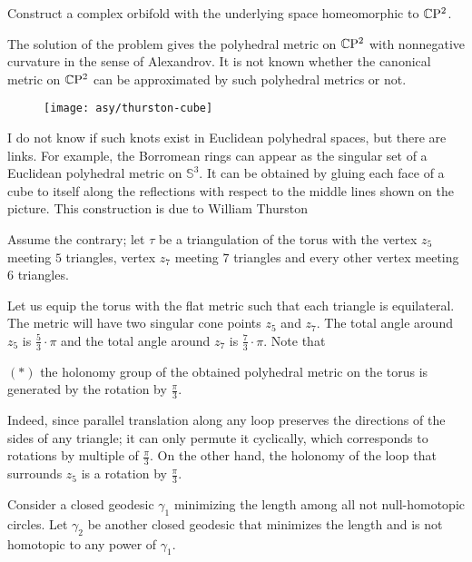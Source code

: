 \begin{pr}
Construct a complex orbifold with the underlying space homeomorphic to $\mathbb{C}\mathrm{P}^2$. 
\end{pr}

The solution of the problem gives the polyhedral metric on $\mathbb{C}\mathrm{P}^2$ with nonnegative curvature in the sense of Alexandrov.
It is not known whether the canonical metric on $\mathbb{C}\mathrm{P}^2$ can be approximated by such polyhedral metrics or not.


\begin{wrapfigure}{r}{23 mm}
\vskip-4mm
\centering
\texttt{[image: asy/thurston-cube]}
\end{wrapfigure}

I do not know if such knots exist in Euclidean polyhedral spaces, but there are links.
For example, the Borromean rings can appear as the singular set of a Euclidean polyhedral metric on $\mathbb S^3$.
It can be obtained by gluing each face of a cube to itself
along the reflections with respect to the middle lines shown on the picture. 
This construction is due to William Thurston \cite{thurston}



Assume the contrary;
let $\tau$ be a triangulation of the torus with the vertex $z_5$ meeting $5$ triangles,
vertex $z_7$ meeting $7$ triangles 
and every other vertex meeting $6$ triangles.

Let us equip the torus with the flat metric such that each triangle is equilateral.
The metric will have two singular cone points $z_5$ and $z_7$.
The total angle around $z_5$ is $\tfrac53\cdot\pi$
and the total angle around $z_7$ is $\tfrac73\cdot\pi$.
Note that

\begin{cl}{$({*})$}
the holonomy group of the obtained polyhedral metric on the torus is generated by the rotation by $\tfrac\pi3$.
\end{cl}

Indeed, since parallel translation along any loop preserves the directions of the sides of any triangle;
it can only permute it cyclically, which corresponds to rotations by multiple of $\tfrac\pi3$. 
On the other hand, the holonomy of the loop that surrounds $z_5$ is a rotation by $\tfrac\pi3$.

Consider a closed geodesic $\gamma_1$ minimizing the length among all not null-homotopic circles.
Let $\gamma_2$ be another closed geodesic that minimizes the length and is not homotopic to any power of $\gamma_1$.

